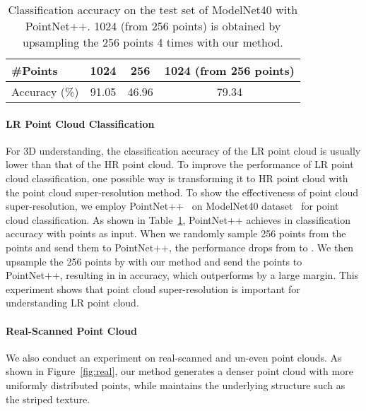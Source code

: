 \documentclass[10pt,twocolumn,letterpaper]{article}
\begin{document}
\begin{table}[!t]
\begin{center}
\begin{tabular}{l|c|c|c}
\hline
\#Points & 1024 & 256 & 1024 (from 256 points) \\
\hline
Accuracy (\%) & 91.05 & 46.96 & 79.34 \\
\hline
\end{tabular}
\end{center}
	\vspace{-1.5em}
	\caption{Classification accuracy on the test set of ModelNet40 with PointNet++. 1024 (from 256 points) is obtained by upsampling the 256 points 4 times with our method.}
	\vspace{-1em}
\label{table:classification}
\end{table}

\vspace{-1em}
\paragraph{LR Point Cloud Classification}
For 3D understanding, the classification accuracy of the LR point cloud is usually lower than that of the HR point cloud.
To improve the performance of LR point cloud classification, one possible way is transforming it to HR point cloud with the point cloud super-resolution method.
To show the effectiveness of point cloud super-resolution, we employ PointNet++~\cite{qi2017pointnet++} on ModelNet40 dataset~\cite{wu20153d} for point cloud classification.
As shown in Table~\ref{table:classification}, PointNet++ achieves  in classification accuracy with  points as input.
When we randomly sample 256 points from the  points and send them to PointNet++, the performance drops from  to .
We then upsample the 256 points by  with our method and send the  points to PointNet++, resulting in  in accuracy, which outperforms  by a large margin.
This experiment shows that point cloud super-resolution is important for understanding LR point cloud.

\vspace{-1em}
\paragraph{Real-Scanned Point Cloud}
We also conduct an experiment on real-scanned and un-even point clouds.
As shown in Figure~\ref{fig:real}, our method generates a denser point cloud with more uniformly distributed points, while maintains the underlying structure such as the striped texture.
\end{document}
